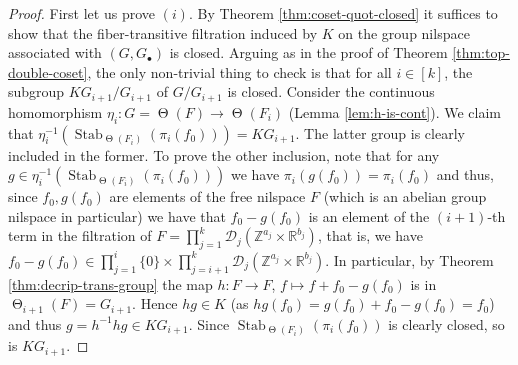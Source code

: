 \documentclass[a4paper,12pt,reqno]{amsart}
\theoremstyle{definition}
\def\to{\rightarrow}
\newcommand{\mc}{\mathcal}
\newcommand{\mb}{\mathbb}
\DeclareMathOperator{\stab}{Stab}
\DeclareMathOperator{\tran}{\Theta}
\begin{document}
 \begin{proof}
First let us prove $(i)$. By Theorem \ref{thm:coset-quot-closed} it suffices to show that the fiber-transitive filtration induced by $K$ on the group nilspace associated with $(G,G_\bullet)$ is closed. Arguing as in the proof of Theorem \ref{thm:top-double-coset}, the only non-trivial thing to check is that for all $i\in[k]$, the subgroup $KG_{i+1}/G_{i+1}$ of $G/G_{i+1}$ is closed. Consider the continuous homomorphism $\eta_i:G=\tran(F)\to \tran(F_i)$ (Lemma \ref{lem:h-is-cont}). We claim that $\eta_i^{-1}(\stab_{\tran(F_i)}(\pi_i(f_0))) = KG_{i+1}$. The latter group is clearly included in the former. To prove the other inclusion, note that for any $g\in \eta_i^{-1}(\stab_{\tran(F_i)}(\pi_i(f_0)))$ we have $\pi_i(g(f_0))=\pi_i(f_0)$ and thus, since $f_0, g(f_0)$ are elements of the free nilspace $F$ (which is an abelian group nilspace in particular) we have that $f_0-g(f_0)$ is an element of the $(i+1)$-th term in the filtration of $F=\prod_{j=1}^k \mc{D}_j(\mb{Z}^{a_j}\times \mb{R}^{b_j})$, that is, we have $f_0-g(f_0) \in \prod_{j=1}^i \{0\}\times \prod_{j=i+1}^k \mc{D}_j(\mb{Z}^{a_j}\times \mb{R}^{b_j})$. In particular, by Theorem \ref{thm:decrip-trans-group} the map $h:F\to F$, $f\mapsto f+f_0-g(f_0)$ is in $\tran_{i+1}(F)=G_{i+1}$. Hence $hg\in K$ (as $hg(f_0)=g(f_0)+f_0-g(f_0)=f_0$) and thus $g = h^{-1}hg\in KG_{i+1}$. Since  $\stab_{\tran(F_i)}(\pi_i(f_0))$ is clearly closed, so is $KG_{i+1}$.


\end{proof}
\end{document}

